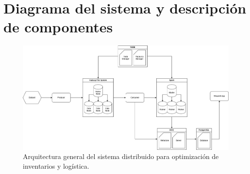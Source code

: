 \documentclass[12pt,a4paper]{article}
\begin{document}
	\newpage
	\section{Diagrama del sistema y descripción de componentes}
	\begin{figure}[h!]
		\centering
		\includegraphics[width=\textwidth]{Diagrama.png}
		\caption{Arquitectura general del sistema distribuido para optimización de inventarios y logística.}
	\end{figure}
	
\end{document}
